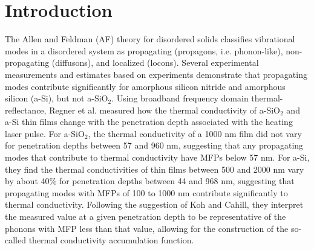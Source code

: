 \documentclass[aps,prb,twocolumn,superscriptaddress,footinbib,amsmath,amssymb,floatfix]{revtex4}
\begin{document}
\section{\label{S:Introduction}Introduction}


The Allen and Feldman (AF) theory for disordered solids   
classifies vibrational modes in a disordered system as 
propagating (propagons, i.e. phonon-like), 
non-propagating (diffusons), and 
localized (locons).\cite{allen_thermal_1993,allen_diffusons_1999} 
Several experimental measurements and estimates based on experiments 
demonstrate that propagating modes contribute significantly 
for amorphous silicon nitride\cite{sultan_heat_2013} and
amorphous silicon (a-Si),\cite{cahill_thermal_1994,liu_high_2009,
yang_anomalously_2010} 
but not 
a-SiO$_2$.\cite{love_estimate_1990,lee_heat_1997,baldi_thermal_2008} 
Using broadband frequency domain thermal-reflectance, 
Regner et al. measured how the thermal conductivity of a-SiO$_2$ and 
a-Si thin films change with the penetration depth associated with the 
heating laser pulse.\cite{regner_broadband_2013} 
For a-SiO$_2$, the thermal conductivity of a 1000 nm 
film did not vary for penetration depths between 57 and 960 nm, 
suggesting that any propagating modes that contribute to thermal 
conductivity have MFPs below 57 nm. For a-Si, they find the 
thermal conductivities of thin films between 500 and 2000 nm 
vary by about 
40$\%$ for penetration depths between 44 and 968 nm, suggesting 
that propagating modes with MFPs of 100 to 1000 nm contribute 
significantly to thermal conductivity.\cite{regner_broadband_2013}  
Following the suggestion of Koh and Cahill, they interpret the 
measured value at a given penetration depth to be representative 
of the phonons with MFP less than that value, allowing for the 
construction of the so-called thermal conductivity accumulation 
function.\cite{dames_thermal_2005,minnich_thermal_2011,
yang_mean_2013}
\end{document}
